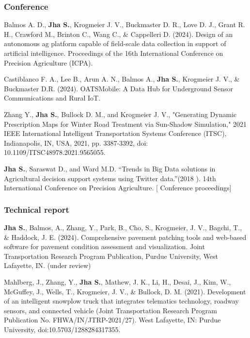 \documentclass[10pt]{article}
\begin{document}
\subsubsection{Conference}
\begin{description}
    \item Balmos A. D., \textbf{Jha S.}, Krogmeier J. V., Buckmaster D. R., Love D. J., Grant R. H., Crawford M., Brinton C., Wang C., \& Cappelleri D. (2024). Design of an autonomous ag platform capable of field-scale data collection in support of artificial intelligence. Proceedings of the 16th International Conference on Precision Agriculture (ICPA).
    \item Castiblanco F. A., Lee B., Arun A. N., Balmos A., \textbf{Jha S.}, Krogmeier J. V., \& Buckmaster D.R. (2024). OATSMobile: A Data Hub for Underground Sensor Communications and Rural IoT. 
    
    \item Zhang Y., \textbf{Jha S.}, Bullock D. M., and Krogmeier J. V., "Generating Dynamic Prescription Maps for Winter Road Treatment via Sun-Shadow Simulation," 2021 IEEE International Intelligent Transportation Systems Conference (ITSC), Indianapolis, IN, USA, 2021, pp. 3387-3392, doi: 10.1109/ITSC48978.2021.9565055.
    \item \textbf{Jha S.}, Saraswat D., and Ward M.D. “Trends in Big Data solutions in Agricultural decision support systems using Twitter data.”(2018 ). 14th International Conference on Precision Agriculture. [ Conference proceedings]
\end{description}
\subsubsection{Technical report}
\begin{description}
    \item \textbf{Jha S.}, Balmos, A., Zhang, Y., Park, B., Cho, S., Krogmeier, J. V., Bagchi, T., \& Haddock, J. E. (2024). Comprehensive pavement patching tools and web-based software for pavement condition assessment and visualization. Joint Transportation Research Program Publication, Purdue University, West Lafayette, IN. (under review)
    \item Mahlberg, J., Zhang, Y., \textbf{Jha S.}, Mathew, J. K., Li, H., Desai, J., Kim, W., McGuffey, J., Wells, T., Krogmeier, J. V., \& Bullock, D. M. (2021). Development of an intelligent snowplow truck that integrates telematics technology, roadway sensors, and connected vehicle (Joint Transportation Research Program Publication No. FHWA/IN/JTRP-2021/27). West Lafayette, IN: Purdue University, doi:10.5703/1288284317355.

\end{description}
\end{document}
